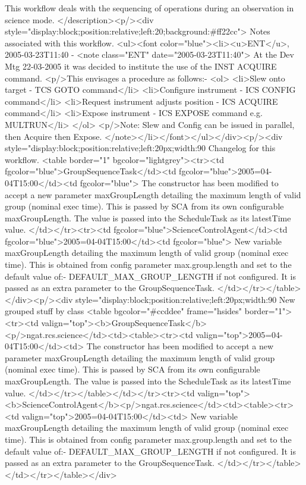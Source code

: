 	This workflow deals with the sequencing of operations during an observation in science mode.
      </description><p/><div style="display:block;position:relative;left:20;background:#ff22cc">
      Notes associated with this workflow.
      <ul><font color="blue"><li><u>ENT</u>, 2005-03-23T11:40 -  <note class="ENT" date="2005-03-23T11:40">
		At the Dev Mtg 22-03-2005 it was decided to institute the use of the INST ACQUIRE command.
		<p/>This envisages a procedure as follows:-
	  	<ol>
	    	<li>Slew onto target - TCS GOTO command</li>
	    	<li>Configure instrument - ICS CONFIG command</li>
	    	<li>Request instrument adjusts position - ICS ACQUIRE command</li>
	    	<li>Expose instrument - ICS EXPOSE command e.g. MULTRUN</li>	 
	  	</ol> 
	  	<p/>Note: Slew and Config can be issued in parallel, then Acquire then Expose.
      </note></li></font></ul></div><p/><div style="display:block;position:relative;left:20px;width:90%
      Changelog for this workflow.
      <table border="1" bgcolor="lightgrey"><tr><td fgcolor="blue">GroupSequenceTask</td><td fgcolor="blue">2005=04-04T15:00</td><td fgcolor="blue">
	    The constructor has been modified to accept a new parameter maxGroupLength
	    detailing the maximum length of valid group (nominal exec time). This is passed by SCA
	    from its own configurable maxGroupLength. The value is passed into the ScheduleTask as its
	    latestTime value.
	  </td></tr><tr><td fgcolor="blue">ScienceControlAgent</td><td fgcolor="blue">2005=04-04T15:00</td><td fgcolor="blue">
	    New variable maxGroupLength detailing the maximum length of valid group (nominal exec time).
	    This is obtained from config parameter max.group.length and set to the default value of:-
	    DEFAULT_MAX_GROUP_LENGTH if not configured. It is passed as an extra parameter to the GroupSequenceTask.
	  </td></tr></table></div><p/><div style="display:block;position:relative;left:20px;width:90%
     New grouped stuff by class
     <table bgcolor="#ccddee" frame="hsides" border="1"><tr><td valign="top"><b>GroupSequenceTask</b><p/>ngat.rcs.science</td><td><table><tr><td valign="top">2005=04-04T15:00</td><td>
	    The constructor has been modified to accept a new parameter maxGroupLength
	    detailing the maximum length of valid group (nominal exec time). This is passed by SCA
	    from its own configurable maxGroupLength. The value is passed into the ScheduleTask as its
	    latestTime value.
	  </td></tr></table></td></tr><tr><td valign="top"><b>ScienceControlAgent</b><p/>ngat.rcs.science</td><td><table><tr><td valign="top">2005=04-04T15:00</td><td>
	    New variable maxGroupLength detailing the maximum length of valid group (nominal exec time).
	    This is obtained from config parameter max.group.length and set to the default value of:-
	    DEFAULT_MAX_GROUP_LENGTH if not configured. It is passed as an extra parameter to the GroupSequenceTask.
	  </td></tr></table></td></tr></table></div>

